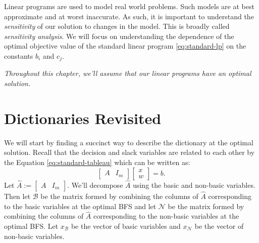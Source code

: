 \documentclass[
]{book}
\theoremstyle{definition}
\theoremstyle{definition}
\theoremstyle{definition}
\theoremstyle{definition}
\theoremstyle{remark}
\begin{document}
Linear programs are used to model real world problems. Such models are at best approximate and at worst inaccurate. As such, it is important to understand the \emph{sensitivity} of our solution to changes in the model. This is broadly called \emph{sensitivity analysis}. We will focus on understanding the dependence of the optimal objective value of the standard linear program \eqref{eq:standard-lp} on the constants \(b_i\) and \(c_j\).

\emph{Throughout this chapter, we'll assume that our linear programs have an optimal solution.}

\hypertarget{dictionaries-revisited}{%
\section{Dictionaries Revisited}\label{dictionaries-revisited}}

We will start by finding a succinct way to describe the dictionary at the optimal solution. Recall that the decision and slack variables are related to each other by the Equation \eqref{eq:standard-tableau} which can be written as:
\begin{equation}
  \begin{bmatrix} A & I_m \end{bmatrix}
    \begin{bmatrix} x \\ w \end{bmatrix}
      = b.
  \label{eq:dictionary-matrix}
\end{equation}
Let \(\widehat{A} := \begin{bmatrix} A & I_m \end{bmatrix}\). We'll decompose \(\widehat{A}\) using the basic and non-basic variables. Then let \(\mathcal{B}\) be the matrix formed by combining the columns of \(\widehat{A}\) corresponding to the basic variables at the optimal BFS and let \(\mathcal{N}\) be the matrix formed by combining the columns of \(\widehat{A}\) corresponding to the non-basic variables at the optimal BFS. Let \(x_{\mathcal{B}}\) be the vector of basic variables and \(x_{\mathcal{N}}\) be the vector of non-basic variables.
\end{document}
